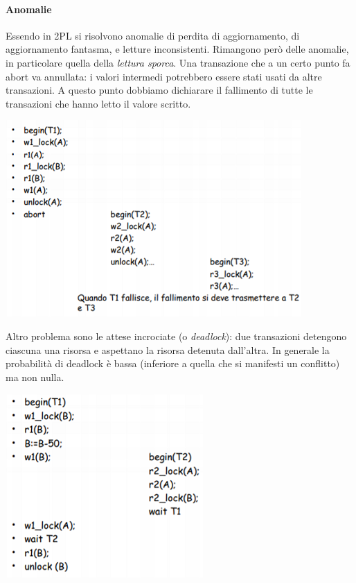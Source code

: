 \paragraph{Anomalie} Essendo in 2PL si risolvono anomalie di perdita di aggiornamento, di aggiornamento fantasma, e letture inconsistenti. Rimangono però delle anomalie, in particolare quella della \emph{lettura sporca}. Una transazione che a un certo punto fa abort va annullata: i valori intermedi potrebbero essere stati usati da altre transazioni. A questo punto dobbiamo dichiarare il fallimento di tutte le transazioni che hanno letto il valore scritto.
\begin{center}\includegraphics{images/167.PNG}\end{center}
Altro problema sono le attese incrociate (o \emph{deadlock}): due transazioni detengono ciascuna una risorsa e aspettano la risorsa detenuta dall'altra. In generale la probabilità di deadlock è bassa (inferiore a quella che si manifesti un conflitto) ma non nulla.
\begin{center}\includegraphics{images/168.PNG}\end{center}